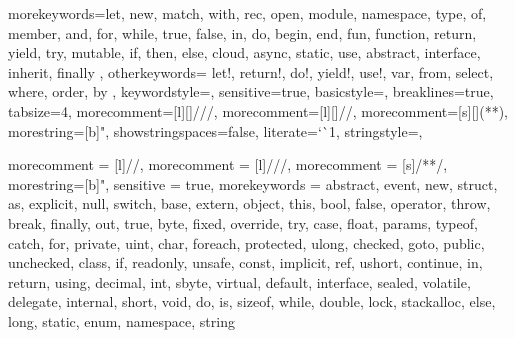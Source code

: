 %
%

\usepackage{hyperref}
\usepackage{graphicx}
\usepackage[margin=2cm]{geometry}
\usepackage{listings}
\usepackage{color}
\usepackage[utf8x]{inputenc}
\usepackage{enumitem}



\usepackage{upquote} %

%
{morekeywords={let, new, match, with, rec, open, module, namespace, type, of, member, %
and, for, while, true, false, in, do, begin, end, fun, function, return, yield, try, %
mutable, if, then, else, cloud, async, static, use, abstract, interface, inherit, finally },
    otherkeywords={ let!, return!, do!, yield!, use!, var, from, select, where, order, by },
    keywordstyle=\color{bluekeywords},
    sensitive=true,
    basicstyle=\ttfamily,
    breaklines=true,
    tabsize=4,
    morecomment=[l][\color{greencomments}]{///},
    morecomment=[l][\color{greencomments}]{//},
    morecomment=[s][\color{greencomments}]{{(*}{*)}},
    morestring=[b]",
    showstringspaces=false,
    literate={`}{\`}1,
    stringstyle=\color{redstrings},
}

{
 morecomment = [l]{//}, 
 morecomment = [l]{///},
 morecomment = [s]{/*}{*/},
 morestring=[b]", 
 sensitive = true,
 morekeywords = {abstract,  event,  new,  struct,
   as,  explicit,  null,  switch,
   base,  extern,  object,  this,
   bool,  false,  operator,  throw,
   break,  finally,  out,  true,
   byte,  fixed,  override,  try,
   case,  float,  params,  typeof,
   catch,  for,  private,  uint,
   char,  foreach,  protected,  ulong,
   checked,  goto,  public,  unchecked,
   class,  if,  readonly,  unsafe,
   const,  implicit,  ref,  ushort,
   continue,  in,  return,  using,
   decimal,  int,  sbyte,  virtual,
   default,  interface,  sealed,  volatile,
   delegate,  internal,  short,  void,
   do,  is,  sizeof,  while,
   double,  lock,  stackalloc,   
   else,  long,  static,   
   enum,  namespace,  string}
}

\lstset{
language=FSharp,
basicstyle=\ttfamily,
breaklines=true,
columns=fullflexible,
xleftmargin=\parindent,
aboveskip=\bigskipamount,
}